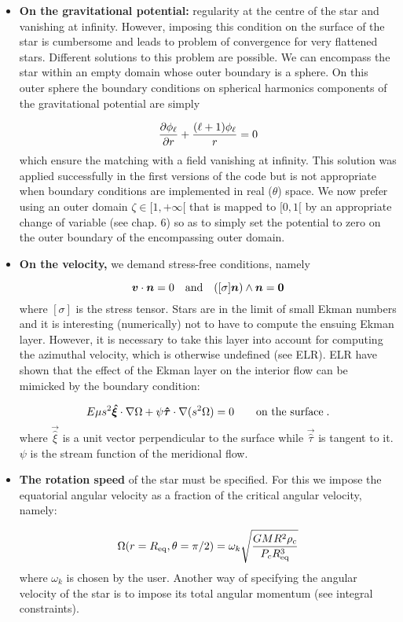 \begin{itemize}
\item {\bf On the gravitational potential:} regularity at the centre of the
star and vanishing at infinity. However, imposing this condition on the
surface of the star is cumbersome and leads to problem of convergence
for very flattened stars. Different solutions to this problem are
possible. We can encompass the star within an empty
domain whose outer boundary is a sphere. On this outer sphere the
boundary conditions on spherical harmonics components of the
gravitational potential are simply

\[ 
\frac{\partial \phi_\ell}{\partial r}+\frac{(\ell+1)\phi_\ell}{r}=0
\]
which ensure the matching with a field vanishing at infinity. This
solution was applied successfully in the first versions of the code but
is not appropriate when boundary conditions are implemented in real
($\theta$) space. We now prefer using an outer domain $\zeta\in
[1,+\infty[$ that is mapped to $[0,1[$ by an appropriate change of
variable (see chap. 6) so as to simply set the potential to zero on the
outer boundary of the encompassing outer domain.

\item {\bf On the velocity,} we demand stress-free conditions, namely

\[ \vv\cdot \vn =0 \quad {\rm and}\quad ([\sigma]\vn)\wedge\vn =\vzero
\]
where $[\sigma]$ is the stress tensor. Stars are in the limit of
small Ekman numbers and it is interesting (numerically) not to have to
compute the ensuing Ekman layer. However, it is necessary to take this
layer into account for computing the azimuthal velocity, which
is otherwise undefined (see ELR).
ELR have shown that the effect of the Ekman layer on
the interior flow can be mimicked by the boundary condition:

\begin{equation}
\label{eq:bl}
E\mu
s^2\vec{\hat\xi}\cdot\na\Omega+\psi\vec{\hat\tau}\cdot\na(s^2\Omega)=0
\qquad\mbox{on the surface}\;.
\end{equation}
where $\vec{\hat\xi}$ is a unit vector perpendicular to the surface
while $\vec{\hat\tau}$ is tangent to it. $\psi$ is the stream
function of the meridional flow.

\item {\bf The rotation speed} of the star must be specified. For this we
impose the equatorial angular velocity as a fraction of the critical
angular velocity, namely:

\[ \Omega(r=R_{\rm eq},\theta=\pi/2) =
\omega_k\sqrt{\frac{GMR^2\rho_c}{P_cR_{\rm eq}^3}}\]
where $\omega_k$ is chosen by the user. Another way of specifying the
angular velocity of the star is to impose its total angular momentum
(see integral constraints).


\end{itemize}
